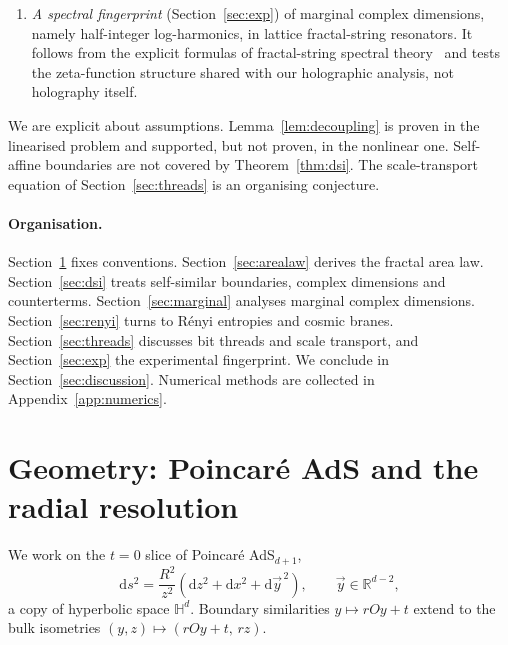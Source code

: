 \documentclass[11pt]{article}
\theoremstyle{definition}\newtheorem{definition}{Definition}[section]
\theoremstyle{remark}\newtheorem*{remark}{Remark}
\newcommand{\RR}{\mathbb{R}}
\newcommand{\dd}{\mathrm{d}}
\begin{document}
\begin{enumerate}
refined R\'enyi entropy is a thermodynamic entropy with respect to the modular
Hamiltonian~\cite{Dong,BeckSchlogl,Baez}. Combining this with the multifractal formalism gives
$\tilde S_q=f(\alpha_q)\ln(1/\varepsilon)$. The identity itself is elementary; its content is that in
Einstein gravity the shape of $f$ is fixed by the bulk, a consistency check that in $d=2$ reproduces the
known Calabrese--Lefevre spectrum~\cite{CL,CT}.
\item \emph{A spectral fingerprint} (Section~\ref{sec:exp}) of marginal complex dimensions, namely half-integer
log-harmonics, in lattice fractal-string resonators. It follows from the explicit formulas of fractal-string
spectral theory~\cite{LvF} and tests the zeta-function structure shared with our holographic analysis, not
holography itself.
\end{enumerate}
We are explicit about assumptions. Lemma~\ref{lem:decoupling} is proven in the linearised problem and
supported, but not proven, in the nonlinear one. Self-affine boundaries are not covered by
Theorem~\ref{thm:dsi}. The scale-transport equation of Section~\ref{sec:threads} is an organising conjecture.

\paragraph{Organisation.}
Section~\ref{sec:geometry} fixes conventions. Section~\ref{sec:arealaw} derives the fractal area law.
Section~\ref{sec:dsi} treats self-similar boundaries, complex dimensions and counterterms.
Section~\ref{sec:marginal} analyses marginal complex dimensions. Section~\ref{sec:renyi} turns to R\'enyi
entropies and cosmic branes. Section~\ref{sec:threads} discusses bit threads and scale transport, and
Section~\ref{sec:exp} the experimental fingerprint. We conclude in Section~\ref{sec:discussion}. Numerical
methods are collected in Appendix~\ref{app:numerics}.

\section{Geometry: Poincar\'e AdS and the radial resolution}
\label{sec:geometry}
We work on the $t=0$ slice of Poincar\'e AdS$_{d+1}$,
\begin{equation}
\dd s^2=\frac{R^2}{z^2}\left(\dd z^2+\dd x^2+\dd\vec y^{\,2}\right),\qquad \vec y\in\RR^{d-2},
\label{eq:slice}
\end{equation}
a copy of hyperbolic space $\mathbb H^d$. Boundary similarities $y\mapsto rOy+t$ extend to the bulk
isometries $(y,z)\mapsto(rOy+t,\,rz)$.
\end{document}
